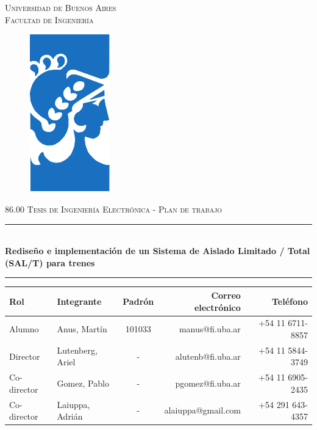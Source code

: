 \documentclass[11pt,a4paper]{article}
\begin{document}

\begin{titlepage}	
	\centering


     \Large{\textsc{Universidad de Buenos Aires}}\\ 
	\Large{\textsc{Facultad de Ingeniería}}\\ 
	\vspace*{1.4cm}	

	\begin{figure}[h]
		\centering
		\includegraphics[width=3.5cm]{img/logo_fiuba.pdf} 	
	\end{figure}
	\vspace*{1cm}

\Huge{\textsc{86.00 Tesis de Ingeniería Electrónica - Plan de trabajo \\}}\vspace{.5cm}
	
	\newcommand{\LargoDeBarra}{1}  %
	
	\rule{\LargoDeBarra\linewidth}{0.3 mm} \\[0.1 cm]
	\huge{\textbf{Rediseño e implementación de un Sistema de Aislado Limitado / Total (SAL/T) para trenes}} \\[-0.3 cm]
	\rule{\LargoDeBarra\linewidth}{0.3 mm}
	\vspace*{0.5cm}
	
	\begin{table}[htb]
    \begin{tabular}{llcrr} \toprule
        Rol & Integrante              & Padrón    & Correo electrónico  & Teléfono  \\\midrule
        Alumno & Anus, Martín     &    101033  & manus@fi.uba.ar & +54 11 6711-8857 \\\midrule
        Director & Lutenberg, Ariel     &    -  & alutenb@fi.uba.ar  & +54 11 5844-3749 \\\midrule
        Co-director & Gomez, Pablo     &    -  & pgomez@fi.uba.ar & +54 11 6905-2435  \\\midrule
        Co-director & Laiuppa, Adrián     &    -  & alaiuppa@gmail.com & +54 291 643-4357 
        \\\bottomrule
    \end{tabular}
    \end{table}
	\vspace{1cm}
	

\end{titlepage}
\end{document}
